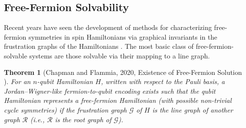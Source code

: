 \documentclass[%
 aip,
 amsmath,amssymb,
 reprint,%
]{revtex4-1}
\newtheorem{theorem}{Theorem}
\newcommand{\kLinIndepComm}{K}           %
\newcommand{\kLinIndepAnti}{R}           %
\begin{document}


\subsection{Free-Fermion Solvability}
\label{sec:free-fermion-solvability}

\indent Recent years have seen the development of methods for characterizing free-fermion symmetries in spin Hamiltonians via graphical invariants in the frustration graphs of the Hamiltonians \cite{Chapman_Fermions, fermion_unified, Elman_Fermions}. The most basic class of free-fermion-solvable systems are those solvable via their mapping to a line graph. 

\begin{theorem}
    [Chapman and Flammia, 2020, Existence of Free-Fermion Solution \cite{Chapman_Fermions}]
    For an $n$-qubit Hamiltonian $H$, written with respect to the Pauli basis, a Jordan--Wigner-like fermion-to-qubit encoding exists such that the qubit Hamiltonian represents a free-fermion Hamiltonian (with possible non-trivial cycle symmetries) if the frustration graph $\mathcal{G}$ of $H$ is the line graph of another graph $\mathcal{R}$ (i.e., $\mathcal{R}$ is the root graph of $\mathcal{G}$).
\end{theorem}
\end{document}
